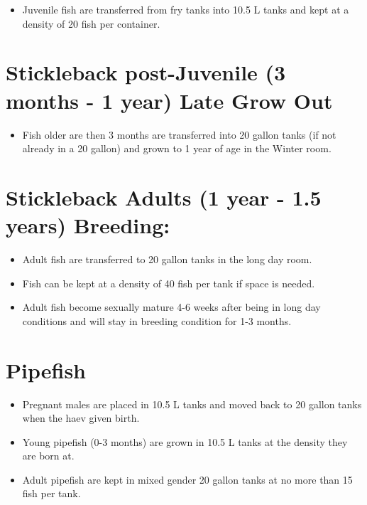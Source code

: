 \documentclass[
  letterpaper,
  DIV=11,
  numbers=noendperiod]{scrreprt}
\providecommand{\tightlist}{%
  \setlength{\itemsep}{0pt}\setlength{\parskip}{0pt}}\usepackage{longtable,booktabs,array}
\begin{document}
\begin{itemize}
\tightlist
\item
  Juvenile fish are transferred from fry tanks into 10.5 L tanks and
  kept at a density of 20 fish per container.
\end{itemize}

\hypertarget{stickleback-post-juvenile-3-months---1-year-late-grow-out}{%
\section{Stickleback post-Juvenile (3 months - 1 year) Late Grow
Out}\label{stickleback-post-juvenile-3-months---1-year-late-grow-out}}

\begin{itemize}
\tightlist
\item
  Fish older are then 3 months are transferred into 20 gallon tanks (if
  not already in a 20 gallon) and grown to 1 year of age in the Winter
  room.
\end{itemize}

\hypertarget{stickleback-adults-1-year---1.5-years-breeding}{%
\section{Stickleback Adults (1 year - 1.5 years)
Breeding:}\label{stickleback-adults-1-year---1.5-years-breeding}}

\begin{itemize}
\tightlist
\item
  Adult fish are transferred to 20 gallon tanks in the long day room.
\item
  Fish can be kept at a density of 40 fish per tank if space is needed.
\item
  Adult fish become sexually mature 4-6 weeks after being in long day
  conditions and will stay in breeding condition for 1-3 months.
\end{itemize}

\hypertarget{pipefish}{%
\section{Pipefish}\label{pipefish}}

\begin{itemize}
\tightlist
\item
  Pregnant males are placed in 10.5 L tanks and moved back to 20 gallon
  tanks when the haev given birth.
\item
  Young pipefish (0-3 months) are grown in 10.5 L tanks at the density
  they are born at.
\item
  Adult pipefish are kept in mixed gender 20 gallon tanks at no more
  than 15 fish per tank.
\end{itemize}
\end{document}
